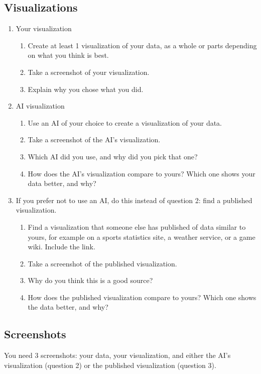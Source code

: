 \documentclass[12pt]{article}
\begin{document}
\subsection*{Visualizations}
    \begin{enumerate}
        \item Your visualization
        \begin{enumerate}
            \item Create at least 1 visualization of your data, as a whole or parts depending on what you think is best.
            \item Take a screenshot of your visualization.
            \item Explain why you chose what you did.
        \end{enumerate}
        \item AI visualization
        \begin{enumerate}
            \item Use an AI of your choice to create a visualization of your data.
            \item Take a screenshot of the AI's visualization.
            \item Which AI did you use, and why did you pick that one?
            \item How does the AI's visualization compare to yours? Which one shows your data better, and why?
        \end{enumerate}
        \item If you prefer not to use an AI, do this instead of question 2: find a published visualization.
        \begin{enumerate}
            \item Find a visualization that someone else has published of data similar to yours, for example on a sports statistics site, a weather service, or a game wiki. Include the link.
            \item Take a screenshot of the published visualization.
            \item Why do you think this is a good source?
            \item How does the published visualization compare to yours? Which one shows the data better, and why?
        \end{enumerate}
    \end{enumerate}

\subsection*{Screenshots}
You need 3 screenshots: your data, your visualization, and either the AI's visualization (question 2) or the published visualization (question 3).
\end{document}
